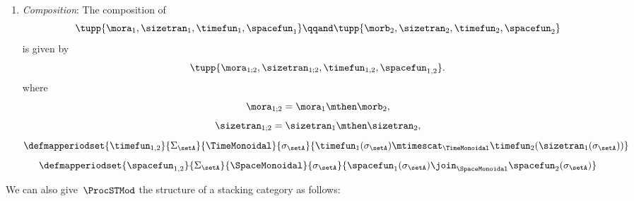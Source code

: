 \begin{definition}
\begin{enumerate}
        \item \emph{Composition}: The composition of
              \begin{equation}
                  \tupp{\mora_1, \sizetran_1,  \timefun_1 , \spacefun_1 }
                  \qqand
                  \tupp{\morb_2, \sizetran_2,  \timefun_2 , \spacefun_2 }
              \end{equation}
              is given by
              \begin{equation}
                  \tupp{
                      \mora_{1;2},
                      \sizetran_{1;2},
                      \timefun_{1,2},
                      \spacefun_{1,2}
                  }.
              \end{equation}
              where
              \begin{equation}
                  \mora_{1;2} = \mora_1 \mthen \morb_2,
              \end{equation}
              \begin{equation}
                  \sizetran_{1;2} = \sizetran_1 \mthen \sizetran_2,
              \end{equation}
              \begin{equation}
                  \defmapperiodset{
                      \timefun_{1,2}
                  }{
                      \Sigma_{\setA}
                  }{
                      \TimeMonoidal
                  }{
                      \sigma_{\setA}
                  }{
                      \timefun_1(\sigma_{\setA}) \mtimescat_{\TimeMonoidal} \timefun_2(\sizetran_1(\sigma_{\setA}))
                  }
              \end{equation}
              \begin{equation}
                  \defmapperiodset{
                      \spacefun_{1,2}
                  }{
                      \Sigma_{\setA}
                  }{
                      \SpaceMonoidal
                  }{
                      \sigma_{\setA}
                  }{
                      \spacefun_1(\sigma_{\setA}) \join_{\SpaceMonoidal} \spacefun_2(\sigma_{\setA})
                  }
              \end{equation}
    \end{enumerate}
\end{definition}

We can also give~$\ProcSTMod$ the structure of a stacking category as follows:

